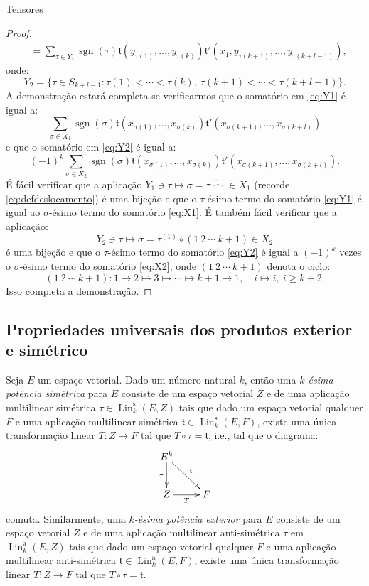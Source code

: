 \documentclass[oneside,11pt]{amsart}
\DeclareMathOperator{\Lin}{Lin}
\DeclareMathOperator{\sgn}{sgn}
\theoremstyle{remark}\newtheorem{exercise}{Exercício}[section]
\theoremstyle{plain}\newtheorem{teo}{Teorema}[section]
\theoremstyle{plain}\newtheorem{lem}[teo]{Lema}
\theoremstyle{plain}\newtheorem{prop}[teo]{Proposição}
\theoremstyle{definition}\newtheorem{defin}[teo]{Definição}
\theoremstyle{remark}\newtheorem{rem}[teo]{Observação}
\theoremstyle{definition}\newtheorem{example}[teo]{Exemplo}
\numberwithin{equation}{section}
\begin{document}
\begin{section}{Tensores}
\begin{proof}
\begin{align}
&=\sum_{\tau\in Y_2}\sgn(\tau)\mathfrak t(y_{\tau(1)},\ldots,y_{\tau(k)})
\mathfrak t'(x_1,y_{\tau(k+1)},\ldots,y_{\tau(k+l-1)}),\label{eq:Y2}
\end{align}
onde:
\[Y_2=\big\{\tau\in S_{k+l-1}:\tau(1)<\cdots<\tau(k),\ \tau(k+1)<\cdots<\tau(k+l-1)\big\}.\]
A demonstração estará completa se verificarmos que o somatório em \eqref{eq:Y1} é igual a:
\begin{equation}\label{eq:X1}
\sum_{\sigma\in X_1}\sgn(\sigma)\mathfrak t(x_{\sigma(1)},\ldots,x_{\sigma(k)})\mathfrak t'(x_{\sigma(k+1)},\ldots,x_{\sigma(k+l)})
\end{equation}
e que o somatório em \eqref{eq:Y2} é igual a:
\begin{equation}\label{eq:X2}
(-1)^k\sum_{\sigma\in X_2}\sgn(\sigma)\mathfrak t(x_{\sigma(1)},\ldots,x_{\sigma(k)})\mathfrak t'(x_{\sigma(k+1)},\ldots,x_{\sigma(k+l)}).
\end{equation}
É fácil verificar que a aplicação $Y_1\ni\tau\mapsto\sigma=\tau^{(1)}\in X_1$ (recorde \eqref{eq:defdeslocamento})
é uma bijeção e que o $\tau$-ésimo termo do somatório \eqref{eq:Y1} é igual ao $\sigma$-ésimo termo do somatório \eqref{eq:X1}. É também fácil
verificar que a aplicação:
\[Y_2\ni\tau\longmapsto\sigma=\tau^{(1)}\circ(1\ 2\ \cdots\ k+1)\in X_2\]
é uma bijeção e que o $\tau$-ésimo termo do somatório \eqref{eq:Y2} é igual a $(-1)^k$ vezes o $\sigma$-ésimo termo do somatório \eqref{eq:X2},
onde $(1\ 2\ \cdots\ k+1)$ denota o ciclo:
\[(1\ 2\ \cdots\ k+1):1\mapsto2\mapsto3\mapsto\cdots\mapsto k+1\mapsto1,\quad i\mapsto i,\ i\ge k+2.\]
Isso completa a demonstração.
\end{proof}

\subsection{Propriedades universais dos produtos exterior e simétrico}\label{sub:univextsim}
Seja $E$ um espaço vetorial. Dado um número natural $k$, então uma {\em $k$-ésima potência simétrica\/} para $E$ consiste
de um espaço vetorial $Z$ e de uma aplicação multilinear simétrica $\tau\in\Lin_k^{\mathrm s}(E,Z)$ tais que
dado um espaço vetorial qualquer $F$ e uma aplicação multilinear
simétrica $\mathfrak t\in\Lin_k^{\mathrm s}(E,F)$, existe uma única transformação linear $T:Z\to F$ tal que $T\circ\tau=\mathfrak t$, i.e., tal que
o diagrama:
\[\xymatrix{%
E^k\ar[dr]^{\mathfrak t}\ar[d]_\tau\\
Z\ar[r]_T&F}\]
comuta. Similarmente, uma {\em $k$-ésima potência exterior\/} para $E$ consiste de um espaço vetorial $Z$ e de uma aplicação multilinear anti-simétrica
$\tau$ em $\Lin_k^{\mathrm a}(E,Z)$ tais que dado um espaço vetorial qualquer $F$ e uma aplicação multilinear
anti-simétrica $\mathfrak t\in\Lin_k^{\mathrm a}(E,F)$, existe uma única transformação linear $T:Z\to F$ tal que $T\circ\tau=\mathfrak t$.


\end{section}
\end{document}
